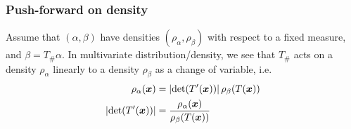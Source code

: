 \documentclass[11pt]{article}
\begin{document}
\subsubsection{Push-forward on density}
Assume that $(\alpha, \beta)$ have densities $(\rho_{\alpha}, \rho_{\beta})$ with respect to a fixed measure, and $\beta = T_{\#}\alpha$. In multivariate distribution/density, we see that $T_{\#}$ acts on a density $\rho_{\alpha}$ linearly to a density $\rho_{\beta}$ as a change of variable, i.e. 
\begin{align}
\rho_{\alpha}(\boldsymbol{x}) &= \left\lvert \det(T'(\boldsymbol{x})) \right\rvert\rho_{\beta}(T(\boldsymbol{x}))  \label{eqn: density of push-forward distribution}\\
\left\lvert \det(T'(\boldsymbol{x})) \right\rvert &= \frac{\rho_{\alpha}(\boldsymbol{x}) }{\rho_{\beta}(T(\boldsymbol{x})) } \nonumber
\end{align}
\end{document}
